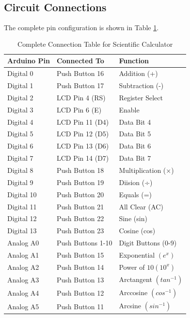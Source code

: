 \documentclass[12pt,a4paper]{article}
\numberwithin{equation}{section}
\numberwithin{figure}{section}
\numberwithin{table}{section}
\begin{document}
\subsection{Circuit Connections}
The complete pin configuration is shown in Table \ref{tab:connections}.
\begin{table}[h]
\centering
\caption{Complete Connection Table for Scientific Calculator}
\label{tab:connections}
\begin{tabular}{>{\ttfamily}ll>{\ttfamily}l}
\toprule
\textbf{Arduino Pin} & \textbf{Connected To} & \textbf{Function} \\
\midrule
Digital 0  & Push Button 16  & Addition (+) \\
Digital 1  & Push Button 17  & Subtraction (-) \\
Digital 2  & LCD Pin 4 (RS)  & Register Select \\
Digital 3  & LCD Pin 6 (E)   & Enable \\
Digital 4  & LCD Pin 11 (D4) & Data Bit 4 \\
Digital 5  & LCD Pin 12 (D5) & Data Bit 5 \\
Digital 6  & LCD Pin 13 (D6) & Data Bit 6 \\
Digital 7  & LCD Pin 14 (D7) & Data Bit 7 \\
Digital 8  & Push Button 18  & Multiplication (×) \\
Digital 9  & Push Button 19  & Diision (÷) \\
Digital 10 & Push Button 20  & Equals (=) \\
Digital 11 & Push Button 21  & All Clear (AC) \\
Digital 12 & Push Button 22  & Sine (sin) \\
Digital 13 & Push Button 23  & Cosine (cos) \\
Analog A0  & Push Buttons 1-10 & Digit Buttons (0-9) \\
Analog A1  & Push Button 15   & Exponential $(e^x)$ \\
Analog A2  & Push Button 14   & Power of $10 (10^x)$ \\
Analog A3  & Push Button 13   & Arctangent $(tan^{-1})$ \\
Analog A4  & Push Button 12   & Arccosine $(cos^{-1})$ \\
Analog A5  & Push Button 11   & Arcsine $(sin^{-1})$ \\
\bottomrule
\end{tabular}
\end{table}
\newpage
\end{document}
